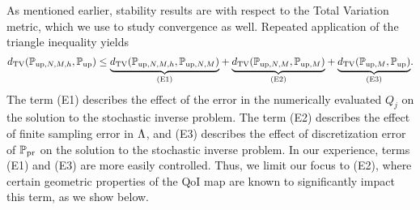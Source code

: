 As mentioned earlier, stability results are with respect to the Total Variation metric, which we use to study convergence as well.
Repeated application of the triangle inequality yields
\begin{equation}
\label{eq:triangleineq}
d_{\text{TV}}(\mathbb{P}_{\text{up},N,M,h}, \operatorname*{\mathbb{P}_{up}}) \leq
\underset{ \text{(E1)} }{\underbrace{ d_{\text{TV}}(\mathbb{P}_{\text{up},N,M,h}, \mathbb{P}_{\text{up},N,M})}} +
\underset{ \text{(E2)} }{\underbrace{ d_{\text{TV}}(\mathbb{P}_{\text{up},N,M}, \mathbb{P}_{\text{up},M}) }}+
\underset{ \text{(E3)} }{\underbrace{ d_{\text{TV}}(\mathbb{P}_{\text{up},M}, \operatorname*{\mathbb{P}_{up}}) }}.
\end{equation}
The term (E1) describes the effect of the error in the numerically evaluated $Q_j$ on the solution to the stochastic inverse problem.
The term (E2) describes the effect of finite sampling error in ${\Lambda}$, and (E3) describes the effect of discretization error of $\operatorname*{\mathbb{P}_{pr}}$ on the solution to the stochastic inverse problem.
In our experience, terms (E1) and (E3) are more easily controlled.
Thus, we limit our focus to (E2), where certain geometric properties of the QoI map are known to significantly impact this term, as we show below.
